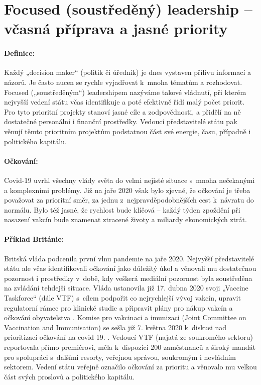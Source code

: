 \section*{Focused (soustředěný) leadership -- včasná příprava a jasné priority}

\paragraph {Definice:} Každý „decision maker“ (politik či úředník) je dnes vystaven přílivu informací a názorů. Je často nucen se rychle vyjadřovat k~mnoha tématům a rozhodovat. Focused („soustředěným“) leadershipem nazýváme takové vládnutí, při kterém nejvyšší vedení státu včas identifikuje a poté efektivně řídí malý počet priorit. Pro tyto prioritní projekty stanoví jasné cíle a zodpovědnosti, a přidělí na ně dostatečné personální i finanční prostředky. Vedoucí představitelé státu pak věnují těmto prioritním projektům podstatnou část své energie, času, případně i politického kapitálu.

\paragraph{Očkování:} Covid-19 uvrhl všechny vlády světa do velmi nejisté situace s~mnoha nečekanými a komplexními problémy. Již na jaře 2020 však bylo zjevné, že očkování je třeba považovat za prioritní směr, za jednu z~nejpravděpodobnějších cest k~návratu do normálu. Bylo též jasné, že rychlost bude klíčová -- každý týden zpoždění při nasazení vakcín bude znamenat ztracené životy a miliardy ekonomických ztrát.

\paragraph{Příklad Británie:} Britská vláda podcenila první vlnu pandemie na jaře 2020. Nejvyšší představitelé státu ale včas identifikovali očkování jako důležitý úkol a věnovali mu dostatečnou pozornost i prostředky v~době, kdy veškerá mediální pozornost byla soustředěna na zvládání tehdejší situace. Vláda ustanovila již 17. dubna 2020 svoji „Vaccine Taskforce“ (dále VTF) s~cílem podpořit co nejrychlejší vývoj vakcín, upravit regulatorní rámec pro klinické studie a připravit plány pro nákup vakcín a očkování obyvatelstva \cite{department_for_business_energy__industrial_strategy_government_2020}. Komise pro vakcinaci a imunizaci (Joint Committee on Vaccination and Immunisation) se sešla již 7. května 2020 k~diskusi nad prioritizací očkování na covid-19. \cite{department_of_health_and_social_care_joint_2020}. Vedoucí VTF (najatá ze soukromého sektoru) reportovala přímo premiérovi, měla k~dispozici 200 zaměstnanců a široký mandát pro spolupráci s~dalšími resorty, veřejnou správou, soukromým i nevládním sektorem. Vedení státu veřejně označilo očkování za prioritu a věnovalo mu velkou část svých proslovů a politického kapitálu.

